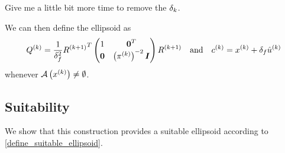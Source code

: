 \documentclass{article}
\begin{document}
\color{magenta}
Give me a little bit more time to remove the $\delta_k$.
\color{black}

We can then define the ellipsoid as
\begin{align}
\label{define_linear_nontrival_ellipsoid}
{Q^{(k)}} = \frac 1 {\delta_f^2} {R^{(k+1)}}^T \begin{pmatrix}
1 & \boldsymbol0^T \\
\boldsymbol 0 & \left({\pi^{(k)}}\right)^{-2} \boldsymbol I \\
\end{pmatrix} {R^{(k+1)}}
\quad
\textrm{and}
\quad
c^{(k)} = x^{(k)}+\delta_{f} {{{\hat u}^{(k)}}}
\end{align}
whenever ${\mathcal A}\left(x^{(k)}\right) \ne \emptyset$.






\subsection{Suitability}

We show that this construction provides a suitable ellipsoid according to \cref{define_suitable_ellipsoid}.

\end{document}
